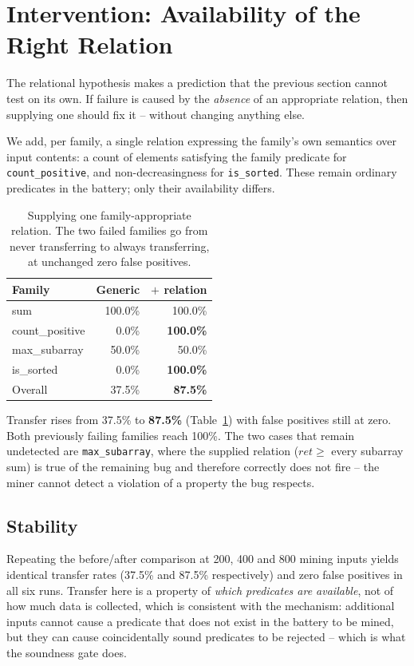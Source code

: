 \documentclass[conference]{IEEEtran}
\begin{document}
\section{Intervention: Availability of the Right Relation}

The relational hypothesis makes a prediction that the previous section cannot test on its
own. If failure is caused by the \emph{absence} of an appropriate relation, then supplying
one should fix it -- without changing anything else.

We add, per family, a single relation expressing the family's own semantics over input
contents: a count of elements satisfying the family predicate for \texttt{count\_positive},
and non-decreasingness for \texttt{is\_sorted}. These remain ordinary predicates in the
battery; only their availability differs.

\begin{table}[t]
\centering
\caption{Supplying one family-appropriate relation. The two failed families go from never
transferring to always transferring, at unchanged zero false positives.}
\label{tab:interv}
\small
\begin{tabular}{@{}lrr@{}}
\toprule
Family & Generic & $+$ relation \\
\midrule
sum & 100.0\% & 100.0\% \\
count\_positive & 0.0\% & \textbf{100.0\%} \\
max\_subarray & 50.0\% & 50.0\% \\
is\_sorted & 0.0\% & \textbf{100.0\%} \\
\midrule
Overall & 37.5\% & \textbf{87.5\%} \\
\bottomrule
\end{tabular}
\end{table}

Transfer rises from 37.5\% to \textbf{87.5\%} (Table~\ref{tab:interv}) with false positives
still at zero. Both previously failing families reach 100\%. The two cases that remain
undetected are \texttt{max\_subarray}, where the supplied relation
($\mathit{ret} \ge$ every subarray sum) is true of the remaining bug and therefore correctly
does not fire -- the miner cannot detect a violation of a property the bug respects.

\subsection{Stability}

Repeating the before/after comparison at 200, 400 and 800 mining inputs yields identical
transfer rates (37.5\% and 87.5\% respectively) and zero false positives in all six runs.
Transfer here is a property of \emph{which predicates are available}, not of how much data
is collected, which is consistent with the mechanism: additional inputs cannot cause a
predicate that does not exist in the battery to be mined, but they can cause coincidentally
sound predicates to be rejected -- which is what the soundness gate does.
\end{document}
